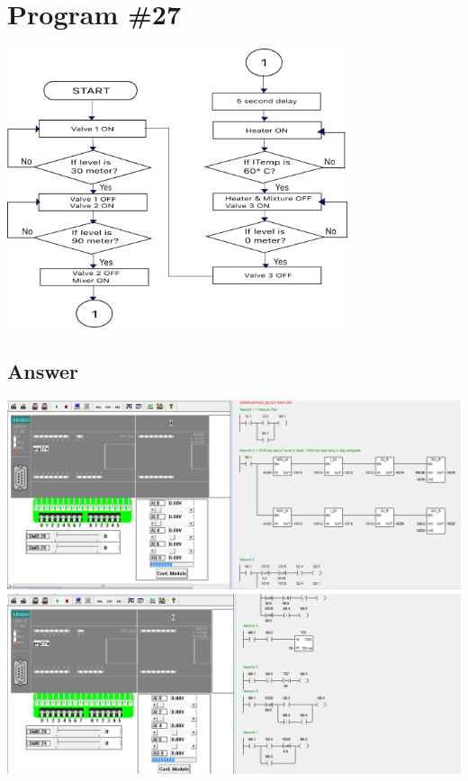 \documentclass[
	12pt, %
]{fphw}
\begin{document}
  \section*{Program \#27}
  \begin{problem}
  \begin{center}
    \includegraphics[width = 100mm, scale = 0.9]{heat_mix_2.png}
    \end{center}                                                   
  \end{problem}
  \subsection*{Answer}
    \begin{center}
    \includegraphics[width = 165mm, scale =0.9]{prg27a1.png}
    \includegraphics[width = 165mm, scale =0.9]{prg27a2.png}
    \end{center}
  
\end{document}
